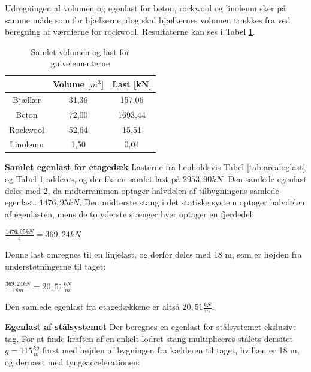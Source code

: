 Udregningen af volumen og egenlast for beton, rockwool og linoleum sker på samme måde som for bjælkerne, dog skal bjælkernes volumen trækkes fra ved beregning af værdierne for rockwool. Resultaterne kan ses i Tabel \ref{tab:gulv}.

\begin{table}
	\begin{center}
		\begin{tabular}{|c|c|c|}
			\hline
			& Volume [$m^3$] & Last [kN] \\ \hline
			Bjælker	 & 31,36 & 157,06	\\ \hline
			Beton    & 72,00 & 1693,44     \\ \hline
			Rockwool & 52,64 & 15,51     \\ \hline
			Linoleum & 1,50 & 0,04     \\ \hline
		\end{tabular}
		\caption{Samlet volumen og last for gulvelementerne}
		\label{tab:gulv}
	\end{center}
\end{table}

\textbf{Samlet egenlast for etagedæk}
\newline
Lasterne fra henholdsvis Tabel \ref{tab:arealoglast} og Tabel \ref{tab:gulv} adderes, og der fås en samlet last på $2953,\!90 kN$. 
\newline \indent{     }  Den samlede egenlast deles med 2, da midterrammen optager halvdelen af tilbygningens samlede egenlast. $1476,\!95 kN$. 
\newline
\newline
Den midterste stang i det statiske system optager halvdelen af egenlasten, mens de to yderste stænger hver optager en fjerdedel:
\begin{center}
	$\frac{1476,\!95 kN}{4} = 369,\!24 kN$
\end{center}

Denne last omregnes til en linjelast, og derfor deles med 18 m, som er højden fra understøtningerne til taget:

\begin{center}
	$\frac{369,\!24 kN}{18 m} = 20,\!51 \frac{kN}{m}$
\end{center}

Den samlede egenlast fra etagedækkene er altså $20,\!51 \frac{kN}{m}$. 

\textbf{Egenlast af stålsystemet}
\newline
Der beregnes en egenlast for stålsystemet ekslusivt tag. 
\newline
\newline
For at finde kraften af en enkelt lodret stang multipliceres stålets densitet $g=115\frac{kg}{m}$ først med højden af bygningen fra kælderen til taget, hvilken er 18 m, og dernæst med tyngeaccelerationen:

